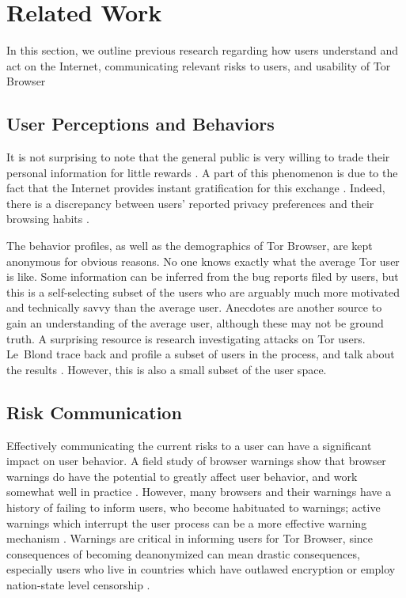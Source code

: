 
\section{Related Work}
In this section, we outline previous research regarding how users understand and act on the Internet, communicating relevant risks to users, and usability of Tor Browser

\subsection{User Perceptions and Behaviors}
It is not surprising to note that the general public is very willing to trade their personal information for little rewards \cite{norberg2007privacy}. A part of this phenomenon is due to the fact that the Internet provides instant gratification for this exchange \cite{acquisti2004privacy}. Indeed, there is a discrepancy between users' reported privacy preferences and their browsing habits \cite{jensen2005privacy}. 

The behavior profiles, as well as the demographics of Tor Browser, are kept anonymous for obvious reasons. No one knows exactly what the average Tor user is like. Some information can be inferred from the bug reports filed by users, but this is a self-selecting subset of the users who are arguably much more motivated and technically savvy than the average user. Anecdotes are another source to gain an understanding of the average user, although these may not be ground truth. A surprising resource is research investigating attacks on Tor users. Le~Blond \etal trace back and profile a subset of users in the process, and talk about the results \cite{blond2011one}. However, this is also a small subset of the user space.  

\subsection{Risk Communication}
Effectively communicating the current risks to a user can have a significant impact on user behavior. A field study of browser warnings show that browser warnings do have the potential to greatly affect user behavior, and work somewhat well in practice \cite{akhawe2013alice}. However, many browsers and their warnings have a history of failing to inform users, who become habituated to warnings; active warnings which interrupt the user process can be a more effective warning mechanism \cite{egelman2008you}. Warnings are critical in informing users for Tor Browser, since consequences of becoming deanonymized can mean drastic consequences, especially users who live in countries which have outlawed encryption or employ nation-state level censorship \cite{crypto_wikipedia_2015,china_wikipedia_2015}. 

